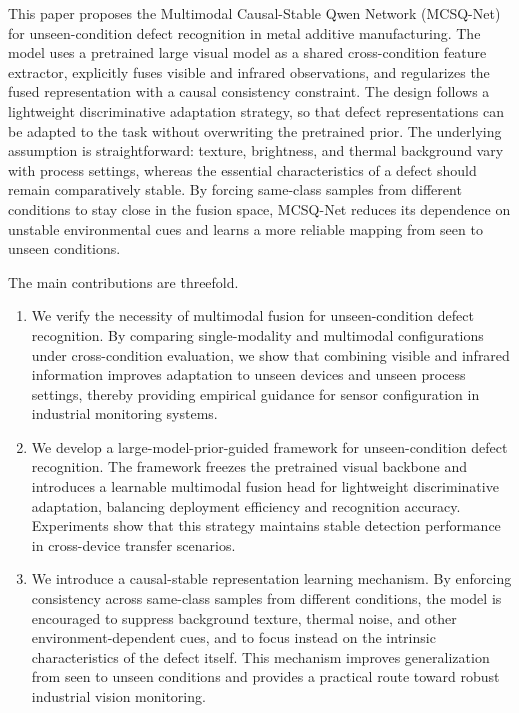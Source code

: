\documentclass[journal]{IEEEtran}
\begin{document}
This paper proposes the Multimodal Causal-Stable Qwen Network (MCSQ-Net) for unseen-condition defect recognition in metal additive manufacturing. The model uses a pretrained large visual model as a shared cross-condition feature extractor, explicitly fuses visible and infrared observations, and regularizes the fused representation with a causal consistency constraint. The design follows a lightweight discriminative adaptation strategy, so that defect representations can be adapted to the task without overwriting the pretrained prior. The underlying assumption is straightforward: texture, brightness, and thermal background vary with process settings, whereas the essential characteristics of a defect should remain comparatively stable. By forcing same-class samples from different conditions to stay close in the fusion space, MCSQ-Net reduces its dependence on unstable environmental cues and learns a more reliable mapping from seen to unseen conditions.

The main contributions are threefold.
\begin{enumerate}
\item We verify the necessity of multimodal fusion for unseen-condition defect recognition. By comparing single-modality and multimodal configurations under cross-condition evaluation, we show that combining visible and infrared information improves adaptation to unseen devices and unseen process settings, thereby providing empirical guidance for sensor configuration in industrial monitoring systems.
\item We develop a large-model-prior-guided framework for unseen-condition defect recognition. The framework freezes the pretrained visual backbone and introduces a learnable multimodal fusion head for lightweight discriminative adaptation, balancing deployment efficiency and recognition accuracy. Experiments show that this strategy maintains stable detection performance in cross-device transfer scenarios.
\item We introduce a causal-stable representation learning mechanism. By enforcing consistency across same-class samples from different conditions, the model is encouraged to suppress background texture, thermal noise, and other environment-dependent cues, and to focus instead on the intrinsic characteristics of the defect itself. This mechanism improves generalization from seen to unseen conditions and provides a practical route toward robust industrial vision monitoring.
\end{enumerate}
\end{document}
